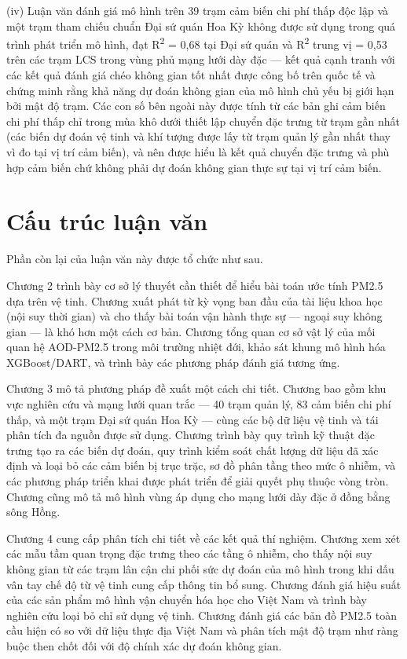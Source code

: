 (iv) Luận văn đánh giá mô hình trên 39 trạm cảm biến chi phí thấp độc lập và một trạm tham chiếu chuẩn Đại sứ quán Hoa Kỳ không được sử dụng trong quá trình phát triển mô hình, đạt R\textsuperscript{2} = 0,68 tại Đại sứ quán và R\textsuperscript{2} trung vị = 0,53 trên các trạm LCS trong vùng phủ mạng lưới dày đặc --- kết quả cạnh tranh với các kết quả đánh giá chéo không gian tốt nhất được công bố trên quốc tế và chứng minh rằng khả năng dự đoán không gian của mô hình chủ yếu bị giới hạn bởi mật độ trạm. Các con số bên ngoài này được tính từ các bản ghi cảm biến chi phí thấp chỉ trong mùa khô dưới thiết lập chuyển đặc trưng từ trạm gần nhất (các biến dự đoán vệ tinh và khí tượng được lấy từ trạm quản lý gần nhất thay vì đo tại vị trí cảm biến), và nên được hiểu là kết quả chuyển đặc trưng và phù hợp cảm biến chứ không phải dự đoán không gian thực sự tại vị trí cảm biến.


\section{Cấu trúc luận văn}

Phần còn lại của luận văn này được tổ chức như sau.

Chương 2 trình bày cơ sở lý thuyết cần thiết để hiểu bài toán ước tính PM2.5 dựa trên vệ tinh. Chương xuất phát từ kỳ vọng ban đầu của tài liệu khoa học (nội suy thời gian) và cho thấy bài toán vận hành thực sự --- ngoại suy không gian --- là khó hơn một cách cơ bản. Chương tổng quan cơ sở vật lý của mối quan hệ AOD-PM2.5 trong môi trường nhiệt đới, khảo sát khung mô hình hóa XGBoost/DART, và trình bày các phương pháp đánh giá tương ứng.

Chương 3 mô tả phương pháp đề xuất một cách chi tiết. Chương bao gồm khu vực nghiên cứu và mạng lưới quan trắc --- 40 trạm quản lý, 83 cảm biến chi phí thấp, và một trạm Đại sứ quán Hoa Kỳ --- cùng các bộ dữ liệu vệ tinh và tái phân tích đa nguồn được sử dụng. Chương trình bày quy trình kỹ thuật đặc trưng tạo ra các biến dự đoán, quy trình kiểm soát chất lượng dữ liệu đã xác định và loại bỏ các cảm biến bị trục trặc, sơ đồ phân tầng theo mức ô nhiễm, và các phương pháp triển khai được phát triển để giải quyết phụ thuộc vòng tròn. Chương cũng mô tả mô hình vùng áp dụng cho mạng lưới dày đặc ở đồng bằng sông Hồng.

Chương 4 cung cấp phân tích chi tiết về các kết quả thí nghiệm. Chương xem xét các mẫu tầm quan trọng đặc trưng theo các tầng ô nhiễm, cho thấy nội suy không gian từ các trạm lân cận chi phối sức dự đoán của mô hình trong khi dấu vân tay chế độ từ vệ tinh cung cấp thông tin bổ sung. Chương đánh giá hiệu suất của các sản phẩm mô hình vận chuyển hóa học cho Việt Nam và trình bày nghiên cứu loại bỏ chỉ sử dụng vệ tinh. Chương đánh giá các bản đồ PM2.5 toàn cầu hiện có so với dữ liệu thực địa Việt Nam và phân tích mật độ trạm như ràng buộc then chốt đối với độ chính xác dự đoán không gian.

